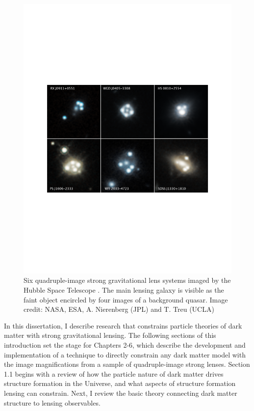 \begin{figure}
	\centering
	\includegraphics[clip,trim=2.5cm 8cm 2.5cm
	8.5cm,width=.9\textwidth,keepaspectratio]{./figures_introduction/lenses.pdf}
	\caption{\label{fig:lens2033} Six quadruple-image strong gravitational lens systems imaged by the Hubble Space Telescope \cite{Nierenberg++19}. The main lensing galaxy is visible as the faint object encircled by four images of a background quasar. Image credit: NASA, ESA, A. Nierenberg (JPL) and T. Treu (UCLA)}
\end{figure}	
In this dissertation, I describe research that constrains particle theories of dark matter with strong gravitational lensing. The following sections of this introduction set the stage for Chapters 2-6, which describe the development and implementation of a technique to directly constrain any dark matter model with the image magnifications from a sample of quadruple-image strong lenses. Section 1.1 begins with a review of how the particle nature of dark matter drives structure formation in the Universe, and what aspects of structure formation lensing can constrain. Next, I review the basic theory connecting dark matter structure to lensing observables. 

